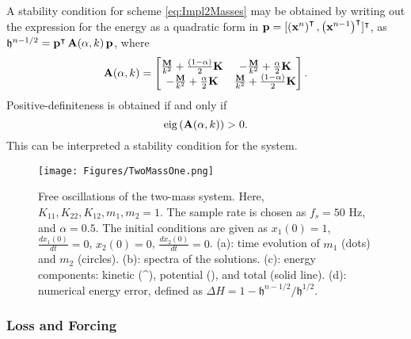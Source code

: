 A stability condition for scheme \eqref{eq:Impl2Masses} may be obtained by writing out the expression for the energy as a quadratic form in ${\bf p} = [\left({\bf x}^n\right)^{\intercal}, \left({\bf x}^{n-1}\right)^{\intercal}]^{\intercal}$, as $\mathfrak{h}^{n-1/2} = {\bf p}^{\intercal}\,{\bf A}(\alpha,k)\,{\bf p}$, where
\begin{equation}
{\bf A}(\alpha,k) = 
\begin{bmatrix}
\frac{{\bf M}}{k^2} + \frac{(1-\alpha)}{2}{\bf K} & -\frac{{\bf M}}{k^2} +\frac{\alpha}{2}{\bf K} \\ -\frac{{\bf M}}{k^2} + \frac{\alpha}{2}{\bf K} & \frac{{\bf M}}{k^2} + \frac{(1-\alpha)}{2}{\bf K}
\end{bmatrix}.
\end{equation}
Positive-definiteness is obtained if and only if 
\begin{equation}\label{eq:StabCondMasses}
\text{eig}\left({\bf A}(\alpha,k)\right) > 0.
\end{equation}
This can be interpreted a stability condition for the system.
\begin{figure}[hbt]
\centering{}
\texttt{[image: Figures/TwoMassOne.png]}
\caption{Free oscillations of the two-mass system. Here, $K_{11},K_{22},K_{12},m_1,m_2=1$. The sample rate is chosen as $f_s = 50$ Hz, and $\alpha = 0.5$. The initial conditions are given as $x_1(0) = 1$, $\frac{dx_1(0)}{dt} =0$, $x_2(0) = 0$, $\frac{dx_2(0)}{dt} =0$. (a): time evolution of $m_1$ (dots) and $m_2$ (circles). (b): spectra of the solutions. (c): energy components: kinetic (\^{}), potential (\text{*}), and total (solid line). (d): numerical energy  error, defined as $\Delta H = 1 - \mathfrak{h}^{n-1/2}/\mathfrak{h}^{1/2}$.}\label{fig:TwoMassOne}
\end{figure}


\subsubsection{Loss and Forcing}

